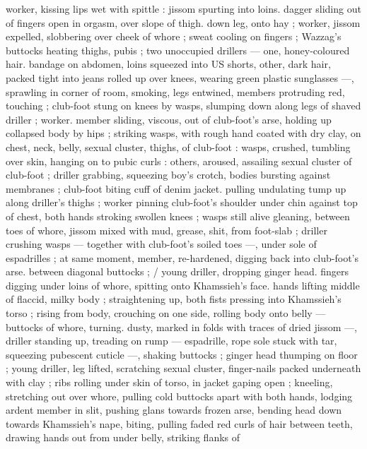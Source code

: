 worker, kissing lips wet with spittle : jissom spurting into loins. 
dagger sliding out of fingers open in orgasm, over slope of thigh. 
down leg, onto hay ; worker, jissom expelled, slobbering over cheek 
of whore ; sweat cooling on fingers ; Wazzag's buttocks heating 
thighs, pubis ; two unoccupied drillers --- one, honey-coloured hair. 
bandage on abdomen, loins squeezed into US shorts, other, dark 
hair, packed tight into jeans rolled up over knees, wearing green 
plastic sunglasses ---, sprawling in corner of room, smoking, legs 
entwined, members protruding red, touching ; club-foot stung on 
knees by wasps, slumping down along legs of shaved driller ; worker. 
member sliding, viscous, out of club-foot's arse, holding up 
collapsed body by hips ; striking wasps, with rough hand coated with 
dry clay, on chest, neck, belly, sexual cluster, thighs, of club-foot : 
wasps, crushed, tumbling over skin, hanging on to pubic curls : 
others, aroused, assailing sexual cluster of club-foot ; driller 
grabbing, squeezing boy's crotch, bodies bursting against 
membranes ; club-foot biting cuff of denim jacket. pulling undulating 
tump up along driller's thighs ; worker pinning club-foot's shoulder 
under chin against top of chest, both hands stroking swollen knees 
; wasps still alive gleaning, between toes of whore, jissom mixed with 
mud, grease, shit, from foot-slab ; driller crushing wasps --- together 
with club-foot's soiled toes ---, under sole of espadrilles ; at same 
moment, member, re-hardened, digging back into club-foot's arse. 
between diagonal buttocks ; {\slash} young driller, dropping ginger head. 
fingers digging under loins of whore, spitting onto Khamssieh's face. 
hands lifting middle of flaccid, milky body ; straightening up, both 
fists pressing into Khamssieh's torso ; rising from body, crouching on 
one side, rolling body onto belly --- buttocks of whore, turning. 
dusty, marked in folds with traces of dried jissom ---, driller standing 
up, treading on rump --- espadrille, rope sole stuck with tar, 
squeezing pubescent cuticle ---, shaking buttocks ; ginger head 
thumping on floor ; young driller, leg lifted, scratching sexual cluster, 
finger-nails packed underneath with clay ; ribs rolling under skin of 
torso, in jacket gaping open ; kneeling, stretching out over whore, 
pulling cold buttocks apart with both hands, lodging ardent member 
in slit, pushing glans towards frozen arse, bending head down 
towards Khamssieh's nape, biting, pulling faded red curls of hair 
between teeth, drawing hands out from under belly, striking flanks of 
